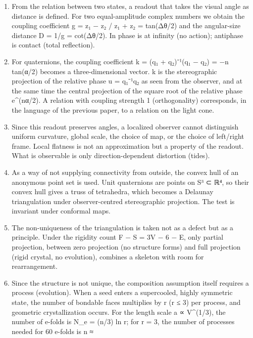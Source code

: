 \documentclass[
  a4paper,
]{article}
\providecommand{\tightlist}{%
  \setlength{\itemsep}{0pt}\setlength{\parskip}{0pt}}
\begin{document}
\begin{enumerate}
\def\labelenumi{\arabic{enumi}.}
\tightlist
\item
  From the relation between two states, a readout that takes the visual
  angle as distance is defined. For two equal-amplitude complex numbers
  we obtain the coupling coefficient g = \textbar z₁ − z₂\textbar{} /
  \textbar z₁ + z₂\textbar{} = tan(Δθ/2) and the angular-size distance D
  = 1/g = cot(Δθ/2). In phase is at infinity (no action); antiphase is
  contact (total reflection).
\item
  For quaternions, the coupling coefficient k = (q₁ + q₂)⁻¹(q₁ − q₂) =
  −n tan(α/2) becomes a three-dimensional vector. k is the stereographic
  projection of the relative phase u = q₁⁻¹q₂ as seen from the observer,
  and at the same time the central projection of the square root of the
  relative phase e\^{}(nα/2). A relation with coupling strength 1
  (orthogonality) corresponds, in the language of the previous paper, to
  a relation on the light cone.
\item
  Since this readout preserves angles, a localized observer cannot
  distinguish uniform curvature, global scale, the choice of map, or the
  choice of left/right frame. Local flatness is not an approximation but
  a property of the readout. What is observable is only
  direction-dependent distortion (tides).
\item
  As a way of not supplying connectivity from outside, the convex hull
  of an anonymous point set is used. Unit quaternions are points on S³ ⊂
  ℝ⁴, so their convex hull gives a truss of tetrahedra, which becomes a
  Delaunay triangulation under observer-centred stereographic
  projection. The test is invariant under conformal maps.
\item
  The non-uniqueness of the triangulation is taken not as a defect but
  as a principle. Under the rigidity count F − S = 3V − 6 − E, only
  partial projection, between zero projection (no structure forms) and
  full projection (rigid crystal, no evolution), combines a skeleton
  with room for rearrangement.
\item
  Since the structure is not unique, the composition assumption itself
  requires a process (evolution). When a seed enters a supercooled,
  highly symmetric state, the number of bondable faces multiplies by r
  (r ≤ 3) per process, and geometric crystallization occurs. For the
  length scale a ∝ V\^{}(1/3), the number of e-folds is N\_e = (n/3) ln
  r; for r = 3, the number of processes needed for 60 e-folds is n ≈

\end{enumerate}
\end{document}
